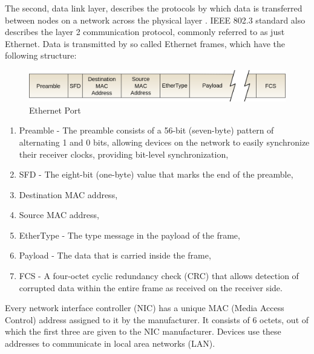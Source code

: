 The second, data link layer, describes the protocols by which data is transferred between nodes on a network across the physical layer \cite{data-link-layer}. IEEE 802.3 standard also describes the layer 2 communication protocol, commonly referred to as just Ethernet. Data is transmitted by so called Ethernet frames, which have the following structure:

\begin{figure}[htp]
\begin{center}
\includegraphics[width=1\textwidth]{Ethernet-frame}
\end{center}
\caption{Ethernet Port}
\label{ethernet-port}
\end{figure}

\begin{enumerate}[nolistsep]
    \item Preamble - The preamble consists of a 56-bit (seven-byte) pattern of alternating 1 and 0 bits, allowing devices on the network to easily synchronize their receiver clocks, providing bit-level synchronization, 
    \item SFD - The eight-bit (one-byte) value that marks the end of the preamble,
    \item Destination MAC address,  
    \item Source MAC address,
    \item EtherType - The type message in the payload of the frame,
    \item Payload - The data that is carried inside the frame,
    \item FCS - A four-octet cyclic redundancy check (CRC) that allows detection of corrupted data within the entire frame as received on the receiver side.
\end{enumerate}

Every network interface controller (NIC) has a unique MAC (Media Access Control) address assigned to it by the manufacturer. It consists of 6 octets, out of which the first three are given to the NIC manufacturer. Devices use these addresses to communicate in local area networks (LAN). 

